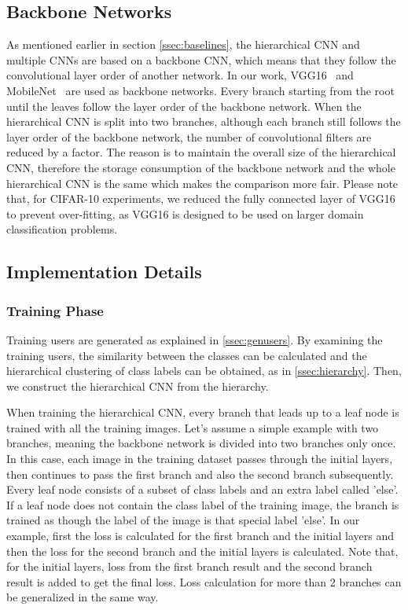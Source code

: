 \subsection{Backbone Networks}

As mentioned earlier in section \ref{ssec:baselines}, the hierarchical CNN and multiple CNNs are based on a backbone CNN, which means that they follow the convolutional layer order of another network.
In our work, VGG16~\cite{simonyan2014very} and MobileNet~\cite{howard2017mobilenets} are used as backbone networks.
Every branch starting from the root until the leaves follow the layer order of the backbone network. 
When the hierarchical CNN is split into two branches, although each branch still follows the layer order of the backbone network, the number of convolutional filters are reduced by a factor.
The reason is to maintain the overall size of the hierarchical CNN, therefore the storage consumption of the backbone network and the whole hierarchical CNN is the same which makes the comparison more fair.
Please note that, for CIFAR-10 experiments, we reduced the fully connected layer of VGG16 to prevent over-fitting, as VGG16 is designed to be used on larger domain classification problems.

\subsection{Implementation Details}

\subsubsection*{Training Phase}
Training users are generated as explained in \ref{ssec:genusers}. 
By examining the training users, the similarity between the classes can be calculated and the hierarchical clustering of class labels can be obtained, as in \ref{ssec:hierarchy}. 
Then, we construct the hierarchical CNN from the hierarchy.

When training the hierarchical CNN, every branch that leads up to a leaf node is trained with all the training images. 
Let's assume a simple example with two branches, meaning the backbone network is divided into two branches only once.
In this case, each image in the training dataset passes through the initial layers, then continues to pass the first branch and also the second branch subsequently.
Every leaf node consists of a subset of class labels and an extra label called 'else'. 
If a leaf node does not contain the class label of the training image, the branch is trained as though the label of the image is that special label 'else'. 
In our example, first the loss is calculated for the first branch and the initial layers and then the loss for the second branch and the initial layers is calculated. 
Note that, for the initial layers, loss from the first branch result and the second branch result is added to get the final loss. 
Loss calculation for more than 2 branches can be generalized in the same way.


